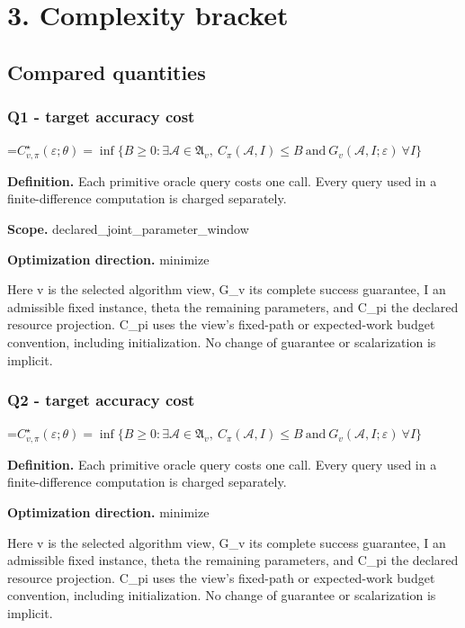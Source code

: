 \documentclass[10pt,a4paper]{article}
\newcommand{\AtlasMath}[1]{\par\begingroup\centering\setbox0=\hbox{$\displaystyle #1$}\ifdim\wd0>1.4\linewidth\typeout{ATLAS WIDE FORMULA: \the\wd0}\fi\ifdim\wd0>\linewidth\resizebox{\linewidth}{!}{\box0}\else\box0\fi\par\endgroup}
\begin{document}
\section{3. Complexity bracket}
\subsection{Compared quantities}
\subsubsection{Q1 - target accuracy cost}
\AtlasMath{C^\star_{v,\pi}(\varepsilon;\theta)=\inf\{B\ge0:\exists\mathcal A\in\mathfrak A_v,\ C_\pi(\mathcal A,I)\le B\ \text{and}\ G_v(\mathcal A,I;\varepsilon)\ \forall I\}}
\textbf{Definition.} Each primitive oracle query costs one call. Every query used in a finite-difference computation is charged separately.

\textbf{Scope.} declared\_joint\_parameter\_window

\textbf{Optimization direction.} minimize

Here v is the selected algorithm view, G\_v its complete success guarantee, I an admissible fixed instance, theta the remaining parameters, and C\_pi the declared resource projection. C\_pi uses the view's fixed-path or expected-work budget convention, including initialization. No change of guarantee or scalarization is implicit.

\subsubsection{Q2 - target accuracy cost}
\AtlasMath{C^\star_{v,\pi}(\varepsilon;\theta)=\inf\{B\ge0:\exists\mathcal A\in\mathfrak A_v,\ C_\pi(\mathcal A,I)\le B\ \text{and}\ G_v(\mathcal A,I;\varepsilon)\ \forall I\}}
\textbf{Definition.} Each primitive oracle query costs one call. Every query used in a finite-difference computation is charged separately.

\textbf{Optimization direction.} minimize

Here v is the selected algorithm view, G\_v its complete success guarantee, I an admissible fixed instance, theta the remaining parameters, and C\_pi the declared resource projection. C\_pi uses the view's fixed-path or expected-work budget convention, including initialization. No change of guarantee or scalarization is implicit.
\end{document}
